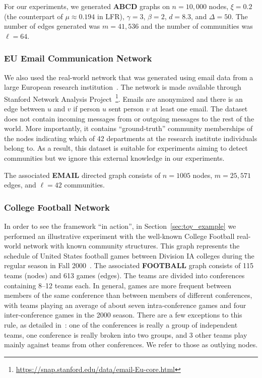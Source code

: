 \documentclass[11pt]{article}
\begin{document}
For our experiments, we generated \textbf{ABCD} graphs on $n=10{,}000$ nodes, $\xi=0.2$ (the counterpart of $\mu \approx 0.194$ in LFR), $\gamma=3$, $\beta=2$, $d=8.3$, and $\Delta =  50$. The number of edges generated was $m=41{,}536$ and the number of communities was $\ell = 64$. 


\subsubsection{EU Email Communication Network}

We also used the real-world network that was generated using email data from a large European research institution~\cite{paranjape2017motifs}. The network is made available through Stanford Network Analysis Project~\cite{leskovec2016snap}\footnote{\url{https://snap.stanford.edu/data/email-Eu-core.html}}. Emails are anonymized and there is an edge between $u$ and $v$ if person $u$ sent person $v$ at least one email. The dataset does not contain incoming messages from or outgoing messages to the rest of the world. More importantly, it contains ``ground-truth'' community memberships of the nodes indicating which of 42 departments at the research institute individuals belong to. As a result, this dataset is suitable for experiments aiming to detect communities but we ignore this external knowledge in our experiments. 

The associated \textbf{EMAIL} directed graph consists of $n=1005$ nodes, $m=25{,}571$ edges, and $\ell = 42$ communities.

\subsubsection{College Football Network}

In order to see the framework ``in action'', in Section~\ref{sec:toy_example} we performed an illustrative experiment with the well-known College Football real-world network with known community structures. This graph represents the schedule of United States football games between Division IA colleges during the regular season in Fall 2000~\cite{girvan2002community}. The associated \textbf{FOOTBALL} graph consists of 115 teams (nodes) and 613 games (edges). The teams are divided into conferences containing 8--12 teams each. In general, games are more frequent between members of the same conference than between members of different conferences, with teams playing an average of about seven intra-conference games and four inter-conference games in the 2000 season. There are a few exceptions to this rule, as detailed in~\cite{lu2018community}: one of the conferences is really a group of independent teams, one conference is really broken into two groups, and 3 other teams play mainly against teams from other conferences. We refer to those as outlying nodes.
\end{document}
